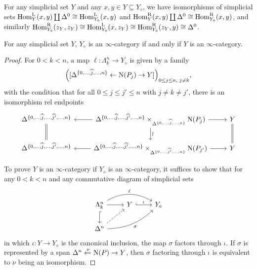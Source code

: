 \documentclass{tac}
\newcommand{\tx}[1]{\textnormal{#1}}
\begin{document}
\begin{rmk}\label{homrdiamondrmk} For any simplicial set $Y$ and any $x,y\in Y \subseteq Y_\diamond$, we have isomorphisms of simplicial sets
$ \tx{Hom}^\tx{L}_Y (x,y) \coprod \Delta^0  \cong \tx{Hom}^\tx{L}_{Y_\diamond} (x,y)$ and $
\tx{Hom}^\tx{R}_Y (x,y) \coprod \Delta^0 \cong \tx{Hom}^\tx{R}_{Y_\diamond} (x,y)$, and similarly $\tx{Hom}^\tx{R}_{Y_\diamond} (z_Y ,z_Y) \cong \tx{Hom}^\tx{L}_{Y_\diamond} (x, z_Y) \cong \tx{Hom}^\tx{R}_{Y_\diamond} (z_Y ,y) \cong \Delta^0$.\end{rmk}
\begin{proposition}\label{convmakesinfty} For any simplicial set $Y$, $Y_\diamond$ is an $\infty$-category if and only if $Y$ is an $\infty$-category.  \end{proposition}
\begin{proof} For $0<k<n$, a map $\ell : \Lambda^n_k \to Y_\diamond$ is given by a family 
\begin{equation}\label{convhorncompat} \Big( [ \Delta^{\{ 0,\dots , \widehat{j} , \dots , n \}} \leftarrow \tx{N}(P_j) \to Y ] \Big)_{0\leq j \leq n, \tx{ } j\neq k} ,\end{equation}
with the condition that for all $0\leq j \leq j' \leq n$ with $j\neq k \neq j'$, there is an isomorphism rel endpoints 
 \[\begin{tikzcd}
{ \Delta^{\{0, \dots , \widehat{j} , \dots , \widehat{j'} , \dots , n \}} } \arrow[equal]{d} & { \Delta^{\{0, \dots , \widehat{j} , \dots , \widehat{j'} , \dots , n \}} \times_{\Delta^{\{0, \dots ,  \widehat{j} , \dots , n \}}} \tx{N}(P_j) } \arrow[]{r}\arrow[]{l}\arrow[]{d}{\rotatebox[origin=c]{90}{$\sim$}} & Y  \arrow[equal]{d}\\
{ \Delta^{\{0, \dots , \widehat{j} , \dots , \widehat{j'} , \dots , n \}}} & {\Delta^{\{0, \dots , \widehat{j} , \dots , \widehat{j'} , \dots , n \}} \times_{\Delta^{\{0, \dots ,  \widehat{j'} , \dots , n \}}} \tx{N}(P_{j'}) } \arrow[]{r}\arrow[]{l}& Y 
 \end{tikzcd}\]

\hfill

To prove $Y$ is an $\infty$-category if $Y_\diamond$ is an $\infty$-category, it suffices to show that for any $0<k<n$ and any commutative diagram of simplicial sets
\[ \begin{tikzcd} \Lambda^n_k \arrow[hook]{d} \arrow[bend left]{rr}{\ell} \arrow[]{r} & Y\arrow[hook]{r}{\iota} & Y_\diamond  \\
\Delta^n \arrow[dashed]{ur} \arrow[bend right=20]{urr}[swap]{\sigma}& & \end{tikzcd} \]
in which $\iota : Y \to Y_\diamond$ is the canonical inclusion, the map $\sigma$ factors through $\iota$.  If $\sigma$ is represented by a span $\Delta^n \xleftarrow{\nu} \tx{N}(P) \to Y$, then $\sigma$ factoring through $\iota$ is equivalent to $\nu$ being an isomorphism.


\end{proof}
\end{document}

